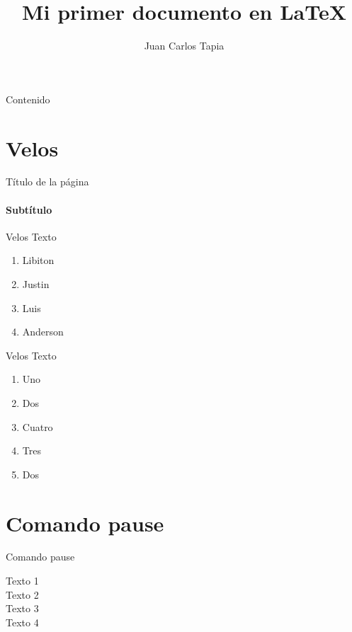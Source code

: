 \documentclass[11pt]{beamer}
\begin{document}
\justifying
\author{Juan Carlos Tapia}
\title{Mi primer documento en \LaTeX}
\begin{frame}[plain]
\maketitle
\end{frame}

\begin{frame}{Contenido}
\tableofcontents
\end{frame}

\section{Velos}

\begin{frame}{Título de la página}
\framesubtitle{Subtítulo}
\lipsum[1]
\end{frame}


\begin{frame}{Velos}
Texto
\begin{enumerate}[<+->]
\item Libiton
\item Justin
\item Luis
\item Anderson
\end{enumerate}
\end{frame}

\begin{frame}{Velos}  %
Texto
\begin{enumerate}
\item<1-> Uno
\item<2-> Dos
\item<4-> Cuatro
\item<3-> Tres
\item<2-> Dos
\end{enumerate}
\end{frame}
\section{Comando pause}

\begin{frame}{Comando pause}

Texto 1\\ \pause
Texto 2 \\ \pause
Texto 3\\
Texto 4 \\
\end{frame}
\end{document}
